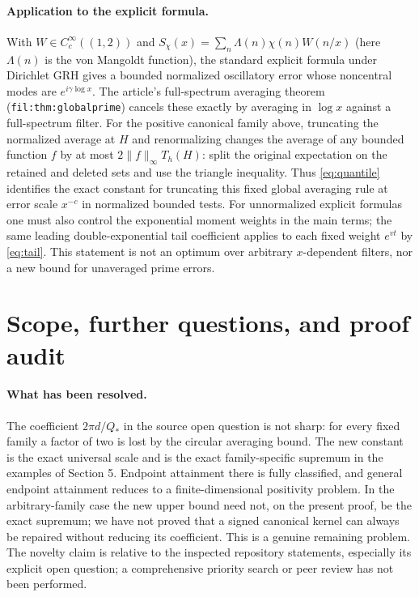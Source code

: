 \documentclass[11pt]{article}
\theoremstyle{definition}\newtheorem{definition}[theorem]{Definition}
\theoremstyle{remark}\newtheorem{remark}[theorem]{Remark}
\begin{document}
\paragraph{Application to the explicit formula.} With $W\in C_c^\infty((1,2))$ and $S_\chi(x)=\sum_n\Lambda(n)\chi(n)W(n/x)$ (here $\Lambda(n)$ is the von Mangoldt function), the standard explicit formula under Dirichlet GRH gives a bounded normalized oscillatory error whose noncentral modes are $e^{i\gamma\log x}$. The article's full-spectrum averaging theorem (\texttt{fil:thm:globalprime}) cancels these exactly by averaging in $\log x$ against a full-spectrum filter. For the positive canonical family above, truncating the normalized average at $H$ and renormalizing changes the average of any bounded function $f$ by at most $2\|f\|_\infty T_h(H)$: split the original expectation on the retained and deleted sets and use the triangle inequality. Thus \eqref{eq:quantile} identifies the exact constant for truncating this fixed global averaging rule at error scale $x^{-c}$ in normalized bounded tests. For unnormalized explicit formulas one must also control the exponential moment weights in the main terms; the same leading double-exponential tail coefficient applies to each fixed weight $e^{vt}$ by \eqref{eq:tail}. This statement is not an optimum over arbitrary $x$-dependent filters, nor a new bound for unaveraged prime errors.

\section{Scope, further questions, and proof audit}
\paragraph{What has been resolved.} The coefficient $2\pi d/Q_*$ in the source open question is not sharp: for every fixed family a factor of two is lost by the circular averaging bound. The new constant is the exact universal scale and is the exact family-specific supremum in the examples of Section 5. Endpoint attainment there is fully classified, and general endpoint attainment reduces to a finite-dimensional positivity problem. In the arbitrary-family case the new upper bound need not, on the present proof, be the exact supremum; we have not proved that a signed canonical kernel can always be repaired without reducing its coefficient. This is a genuine remaining problem. The novelty claim is relative to the inspected repository statements, especially its explicit open question; a comprehensive priority search or peer review has not been performed.
\end{document}
